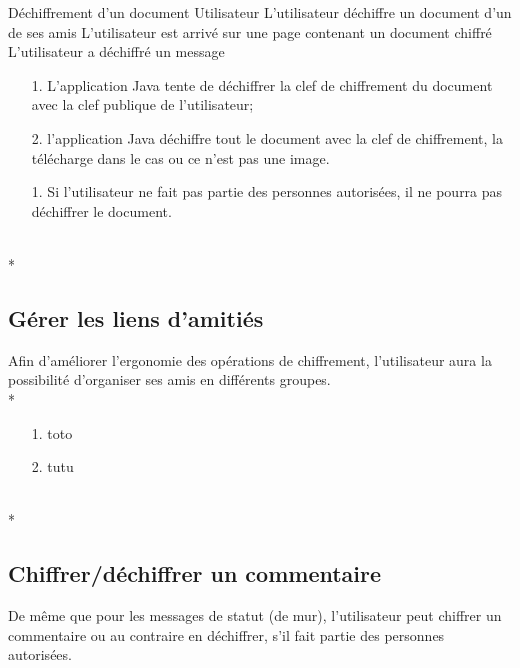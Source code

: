 \documentclass[a4paper,11pt,french]{article}
\begin{document}
\fiche
	{Déchiffrement d'un document}
	{Utilisateur}
	{L'utilisateur déchiffre un document d'un de ses amis}
	{}
	{L'utilisateur est arrivé sur une page contenant un document chiffré}
	{L'utilisateur a déchiffré un message}
    {}
	{\begin{itemize}
        \item[]
		\item[1.] L'application Java tente de déchiffrer la clef de chiffrement
            du document avec la clef publique de l'utilisateur;
		\item[2.] l'application Java déchiffre tout le document avec la clef
            de chiffrement, la télécharge dans le cas ou ce n'est pas
            une image.
	\end{itemize}
	}
	{}
\flots
    {}
    {\begin{itemize}
    \item[]
    \item[1.] Si l'utilisateur ne fait pas partie des personnes
        autorisées, il ne pourra pas déchiffrer le document.
    \end{itemize}
    }
	{}    
\\*

\subsection{Gérer les liens d'amitiés}
Afin d'améliorer l'ergonomie des opérations de chiffrement, 
l'utilisateur aura la possibilité d'organiser ses amis en
différents groupes. \\*

\fiche
	{}
	{}
	{}
	{}
	{}
	{}
	{\begin{itemize}
	    \item[]
		\item[1.] toto
	\end{itemize}
	}
	{\begin{itemize}
        \item[]
		\item[2.] tutu
	\end{itemize}
	}
	{}
\flots
    {}
	{}    
\\*

\subsection{Chiffrer/déchiffrer un commentaire}
De même que pour les messages de statut (de mur), l'utilisateur
peut chiffrer un commentaire ou au contraire en déchiffrer,
s'il fait partie des personnes autorisées.
\end{document}
